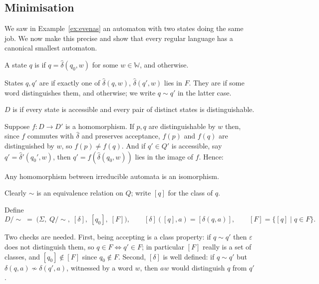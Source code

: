 \documentclass[a4paper]{scrartcl}
\newcommand{\WW}{\mathbb{W}}
\newcommand{\eps}{\varepsilon}
\begin{document}
\subsection{Minimisation}\label{sec:minimisation}

We saw in Example~\ref{ex:evenas} an automaton with two states doing the same job. We now make this precise and show that every regular language has a canonical smallest automaton.

\begin{definition}
	A state $q$ is  if $q = \hat\delta(q_0, w)$ for some $w \in \WW$, and  otherwise.

	States $q, q'$ are  if exactly one of $\hat\delta(q,w)$, $\hat\delta(q',w)$ lies in $F$. They are  if some word distinguishes them, and  otherwise; we write $q \sim q'$ in the latter case.

	$D$ is  if every state is accessible and every pair of distinct states is distinguishable.
\end{definition}

Suppose $f \colon D \to D'$ is a homomorphism. If $p,q$ are distinguishable by $w$ then, since $f$ commutes with $\hat\delta$ and preserves acceptance, $f(p)$ and $f(q)$ are distinguished by $w$, so $f(p) \neq f(q)$. And if $q' \in Q'$ is accessible, say $q' = \hat\delta'(q_0',w)$, then $q' = f(\hat\delta(q_0,w))$ lies in the image of $f$. Hence:

\begin{proposition}\label{prop:irreduciblehom}
	Any homomorphism between irreducible automata is an isomorphism.
\end{proposition}

Clearly $\sim$ is an equivalence relation on $Q$; write $[q]$ for the class of $q$.

\begin{definition}
	Define
	$$D/{\sim} \;=\; \big(\Sigma,\; Q/{\sim},\; [\delta],\; [q_0],\; [F]\big), \qquad [\delta]([q],a) = [\delta(q,a)], \qquad [F] = \{[q] \mid q \in F\}.$$
\end{definition}

Two checks are needed. First, being accepting is a class property: if $q \sim q'$ then $\eps$ does not distinguish them, so $q \in F \iff q' \in F$; in particular $[F]$ really is a set of classes, and $[q_0] \notin [F]$ since $q_0 \notin F$. Second, $[\delta]$ is well defined: if $q \sim q'$ but $\delta(q,a) \not\sim \delta(q',a)$, witnessed by a word $w$, then $aw$ would distinguish $q$ from $q'$.
\end{document}
